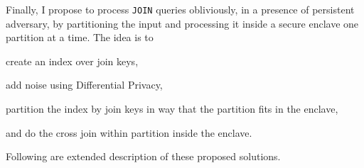 		Finally, I propose to process \texttt{JOIN} queries obliviously, in a presence of persistent adversary, by partitioning the input and processing it inside a secure enclave one partition at a time.
		The idea is to
		\begin{enumerate*}[label=(\roman*)] %
			\item create an index over join keys,
			\item add noise using Differential Privacy,
			\item partition the index by join keys in way that the partition fits in the enclave,
			\item and do the cross join within partition inside the enclave.
		\end{enumerate*}

	Following are extended description of these proposed solutions.
